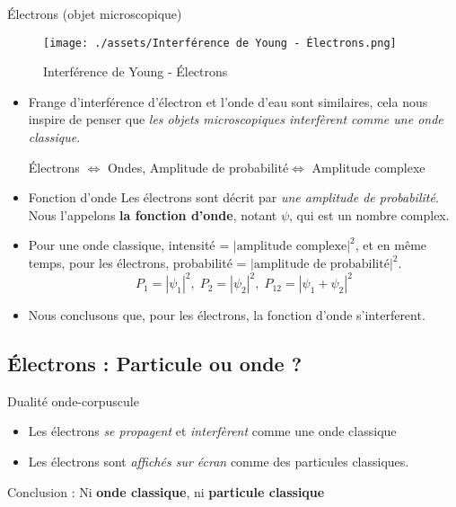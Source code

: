 \begin{Prop}{Électrons (objet microscopique)}{}
                \begin{figure}[H] %
                    \centering
                    \texttt{[image: ./assets/Interférence de Young - Électrons.png]}
                    \caption{Interférence de Young - Électrons}
                    \label{fig:Interfe-rence-de-Young-E-lectrons}
                \end{figure}
                
                \begin{itemize}
                    \item Frange d'interférence d'électron et l'onde d'eau sont similaires, cela nous inspire de penser que \textit{les objets microscopiques interfèrent comme une onde classique}.
                        \begin{center}
                        Électrons $\iff$ Ondes,\; Amplitude de probabilité$\iff$ Amplitude complexe 
                        \end{center}
                    \item \begin{claim}[colbacktitle=red!75!black]{Fonction d'onde}{}
                Les électrons sont décrit par \textit{une amplitude de probabilité}. Nous l'appelons \textbf{la fonction d'onde}, notant $\psi$, qui est un nombre complex.
                \end{claim}
                    \item Pour une onde classique, intensité = $|\text{amplitude complexe}|^{2}$, et en même temps, pour les électrons, probabilité = $|\text{amplitude de probabilité}|^{2}$.
                        \[
                        P_1 = |\psi_1|^2,\; P_2 = |\psi_2|^2,\; P_{12} = |\psi_1 + \psi_2|^2
                        \]
                    \item Nous conclusons que, pour les électrons, la fonction d'onde s'interferent.
                \end{itemize}
\end{Prop}

\subsection{Électrons : Particule ou onde ?}

\begin{Prop}{Dualité onde-corpuscule}{}
        \begin{itemize}
            \item Les électrons \textit{se propagent} et \textit{interfèrent} comme une onde classique
            \item Les électrons sont \textit{affichés sur écran} comme des particules classiques.
        \end{itemize}

        Conclusion : Ni \textbf{onde classique}, ni \textbf{particule classique}
\end{Prop}


